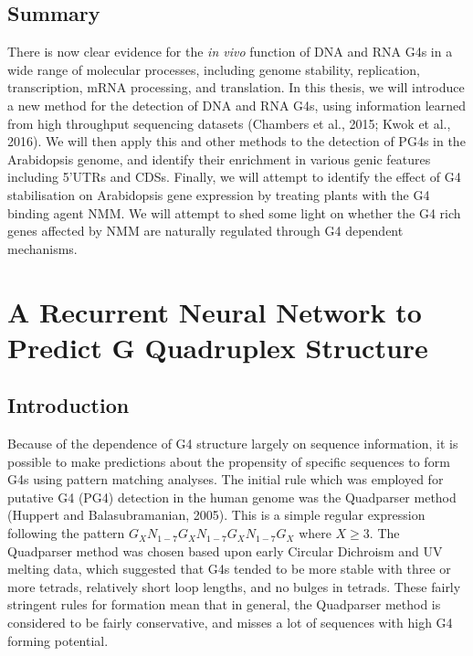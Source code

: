\documentclass[12pt,a4paper,]{report}
\begin{document}
\newpage

\hypertarget{summary}{%
\section{Summary}\label{summary}}

\label{ssec:intro_summary}

There is now clear evidence for the \emph{in vivo} function of DNA and
RNA G4s in a wide range of molecular processes, including genome
stability, replication, transcription, mRNA processing, and translation.
In this thesis, we will introduce a new method for the detection of DNA
and RNA G4s, using information learned from high throughput sequencing
datasets (Chambers et al., 2015; Kwok et al., 2016). We will then apply
this and other methods to the detection of PG4s in the Arabidopsis
genome, and identify their enrichment in various genic features
including 5'UTRs and CDSs. Finally, we will attempt to identify the
effect of G4 stabilisation on Arabidopsis gene expression by treating
plants with the G4 binding agent NMM. We will attempt to shed some light
on whether the G4 rich genes affected by NMM are naturally regulated
through G4 dependent mechanisms.

\newpage

\hypertarget{a-recurrent-neural-network-to-predict-g-quadruplex-structure}{%
\chapter{A Recurrent Neural Network to Predict G Quadruplex
Structure}\label{a-recurrent-neural-network-to-predict-g-quadruplex-structure}}

\label{chap:g4seeqer}

\hypertarget{introduction-1}{%
\section{Introduction}\label{introduction-1}}

Because of the dependence of G4 structure largely on sequence
information, it is possible to make predictions about the propensity of
specific sequences to form G4s using pattern matching analyses. The
initial rule which was employed for putative G4 (PG4) detection in the
human genome was the Quadparser method (Huppert and Balasubramanian,
2005). This is a simple regular expression following the pattern
\(G_{X}N_{1-7}G_{X}N_{1-7}G_{X}N_{1-7}G_{X}\) where \(X\geqslant 3\).
The Quadparser method was chosen based upon early Circular Dichroism and
UV melting data, which suggested that G4s tended to be more stable with
three or more tetrads, relatively short loop lengths, and no bulges in
tetrads. These fairly stringent rules for formation mean that in
general, the Quadparser method is considered to be fairly conservative,
and misses a lot of sequences with high G4 forming potential.
\end{document}
